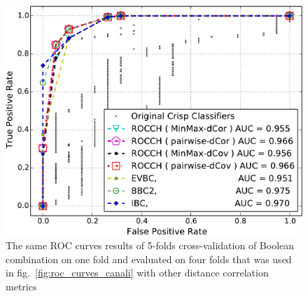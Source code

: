 \begin{figure}[t]
\centering
\includegraphics[width=\columnwidth]{figs/Canali/IBC_BCC_Pruned_Classifier_ConvexHull_withoutRandom_validation_4fold_dCov}
\caption{The same ROC curves results of 5-folds cross-validation of Boolean combination on one fold and evaluated on four folds that was used in fig.~\ref{fig:roc_curves_canali} with other distance correlation metrics}
\label{fig:roc_curves_dcov_canali}
\end{figure}



\begin{table}[b]
    \centering
    \renewcommand{\arraystretch}{1.3}
    \caption{Average AUC values and their standard deviations over the 5FCV for each techniques. Design on four folds and evaluated on one fold on Canali. }
    \label{tab:auc_canali}
    \centering
\end{table}

